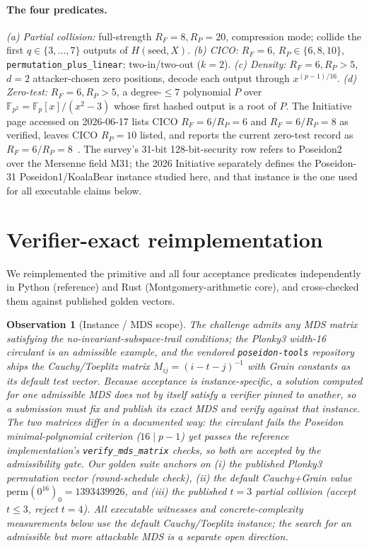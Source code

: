 \documentclass[11pt]{article}
\newcommand{\Fp}{\mathbb{F}_p}
\newcommand{\Fpp}{\mathbb{F}_{p^2}}
\newcommand{\RF}{R_F}
\newcommand{\RP}{R_P}
\newcommand{\Verified}[1]{}
\newcommand{\Verified}[1]{\marginpar{\footnotesize\textcolor{blue}{[V: #1]}}}
\theoremstyle{plain}
\newtheorem{observation}{Observation}
\begin{document}
\paragraph{The four predicates.} \emph{(a) Partial collision:} full-strength
$\RF=8,\RP=20$, compression mode; collide the first $q\in\{3,\dots,7\}$ outputs of
$H(\mathrm{seed},X)$. \emph{(b) CICO:} $\RF=6$, $\RP\in\{6,8,10\}$,
\texttt{permutation\_plus\_linear}; two-in/two-out ($k=2$). \emph{(c) Density:}
$\RF=6,\RP>5$, $d=2$ attacker-chosen zero positions, decode each output through
$x^{(p-1)/16}$. \emph{(d) Zero-test:} $\RF=6,\RP>5$, a degree-$\le 7$ polynomial
$P$ over $\Fpp=\Fp[x]/(x^2-3)$ whose first hashed output is a root of $P$.
The Initiative page accessed on 2026-06-17 lists CICO $\RF=6/\RP=6$ and
$\RF=6/\RP=8$ as verified, leaves CICO $\RP=10$ listed, and reports the current
zero-test record as $\RF=6/\RP=8$~\cite{initiative}.
The survey's 31-bit 128-bit-security row refers to Poseidon2 over the Mersenne
field M31; the 2026 Initiative separately defines the Poseidon-31
Poseidon1/KoalaBear instance studied here, and that instance is the one
used for all executable claims below.

\section{Verifier-exact reimplementation}\label{sec:verifier}
We reimplemented the primitive and all four acceptance predicates independently in
Python (reference) and Rust (Montgomery-arithmetic core), and cross-checked them
against published golden vectors. \Verified{golden 14/14}

\begin{observation}[Instance / MDS scope]
The challenge admits any MDS matrix satisfying the no-invariant-subspace-trail
conditions; the Plonky3 width-16 circulant is an admissible example, and the
vendored \texttt{poseidon-tools} repository ships the Cauchy/Toeplitz matrix
$M_{ij}=(i-t-j)^{-1}$ with Grain constants as its default test vector. Because
acceptance is instance-specific, a solution computed for one admissible MDS does
not by itself satisfy a verifier pinned to another, so a submission must fix and
publish its exact MDS and verify against that instance. The two matrices differ
in a documented way: the circulant \emph{fails} the Poseidon
minimal-polynomial criterion ($16 \mid p-1$) yet \emph{passes} the
reference implementation's \texttt{verify\_mds\_matrix} checks, so both are
accepted by the admissibility gate. Our golden suite anchors
on (i) the published Plonky3 permutation vector
(round-schedule check), (ii) the default Cauchy+Grain value
$\mathrm{perm}(0^{16})_0 = 1393439926$, and (iii) the published $t=3$ partial
collision (accept $t\le 3$, reject $t=4$). \Verified{mds\_matrix; golden}
All executable witnesses and concrete-complexity measurements below use the
default Cauchy/Toeplitz instance; the search for an admissible but more attackable
MDS is a separate open direction.
\end{observation}
\end{document}
